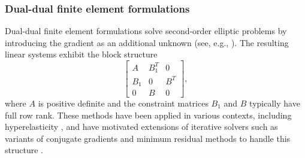 \documentclass{article}
\begin{document}
\subsubsection{Dual-dual finite element formulations}
Dual-dual finite element formulations solve second-order elliptic problems by introducing the gradient as an additional unknown (see, e.g., \cite{gh01}). The resulting linear systems exhibit the block structure
\[
\begin{bmatrix}
A & B_1^T & 0 \\
B_1 & 0 & B^T \\
0 & B & 0
\end{bmatrix},
\]
where $A$ is positive definite and the constraint matrices $B_1$ and $B$ typically have full row rank. These methods have been applied in various contexts, including hyperelasticity \cite{gh00}, and have motivated extensions of iterative solvers  such as variants of conjugate gradients and minimum residual methods to handle this structure \cite{gh00b,gh01}.
\end{document}
